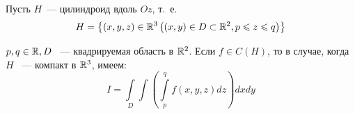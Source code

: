 \documentclass[../../main.tex]{subfiles}
\begin{document}
	
	\begin{theorem}
		Пусть $H$~--- цилиндроид вдоль $Oz$, т.~е.
		\begin{equation}
			H = \left\{(x, y, z) \in \mathbb{R}^3 \left(\left(x, y\right) \in D \subset \mathbb{R}^2, p 
			\leqslant z \leqslant q\right) \right\}
			\label{lec14:1}
		\end{equation}
		
		 $p, q \in \mathbb{R}, D$ ~--- квадрируемая область в $\mathbb{R}^2$. Если $f \in C(H)$, то 
		 в случае, когда $H$ ~--- компакт в $\mathbb{R}^3$, имеем:
		\begin{equation}
		\label{lec14:2}
		I = \int\limits_{D} \int \left(\int\limits_p^q f\left(x, y, 
		z\right)dz\right)dxdy 
		\end{equation}
	\end{theorem}
		
\end{document}
